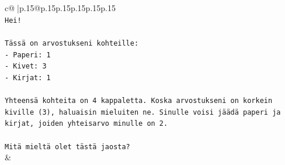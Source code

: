 \documentclass{article}
\begin{document}
{\begin{supertabular}{c@{$\;$}|p{.15\linewidth}@{}p{.15\linewidth}p{.15\linewidth}p{.15\linewidth}p{.15\linewidth}p{.15\linewidth}}
{{{\\ 
\texttt{Hei!} \\
\\ 
\texttt{Tässä on arvostukseni kohteille:} \\
\texttt{{-} Paperi: 1} \\
\texttt{{-} Kivet: 3} \\
\texttt{{-} Kirjat: 1} \\
\\ 
\texttt{Yhteensä kohteita on 4 kappaletta. Koska arvostukseni on korkein kiville (3), haluaisin mieluiten ne. Sinulle voisi jäädä paperi ja kirjat, joiden yhteisarvo minulle on 2.} \\
\\ 
\texttt{Mitä mieltä olet tästä jaosta?} \\
            }
        }
    }
    & \\ \\


\end{supertabular}}
\end{document}
